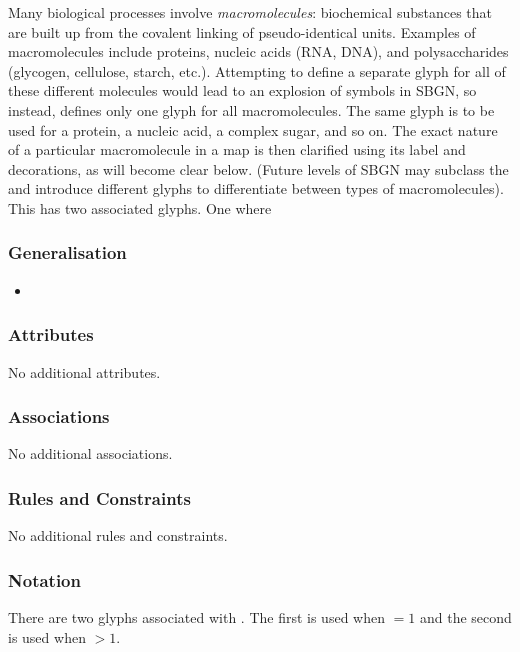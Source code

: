 Many biological processes involve \emph{macromolecules}: biochemical
substances that are built up from the covalent linking of
pseudo-identical units.  Examples of macromolecules include proteins,
nucleic acids (RNA, DNA), and polysaccharides (glycogen, cellulose,
starch, etc.).  Attempting to define a separate glyph for all of these
different molecules would lead to an explosion of symbols in SBGN, so
instead, \SBGNPDLone defines only one glyph for all macromolecules.
The same glyph is to be used for a protein, a nucleic acid, a complex
sugar, and so on.  The exact nature of a particular macromolecule in a
map is then clarified using its label and decorations, as will become
clear below.  (Future levels of SBGN may subclass the
 and introduce different glyphs to differentiate
between types of macromolecules). This has two associated glyphs. One
where 

\subsubsection{Generalisation}

\begin{itemize}
\item {}
\end{itemize}

\subsubsection{Attributes}

No additional attributes.

\subsubsection{Associations}

No additional associations.

\subsubsection{Rules and Constraints}

No additional rules and constraints.

\subsubsection{Notation}

There are two glyphs associated with . The
first  is used when  $= 1$
and the second  is used when
 $> 1$.

